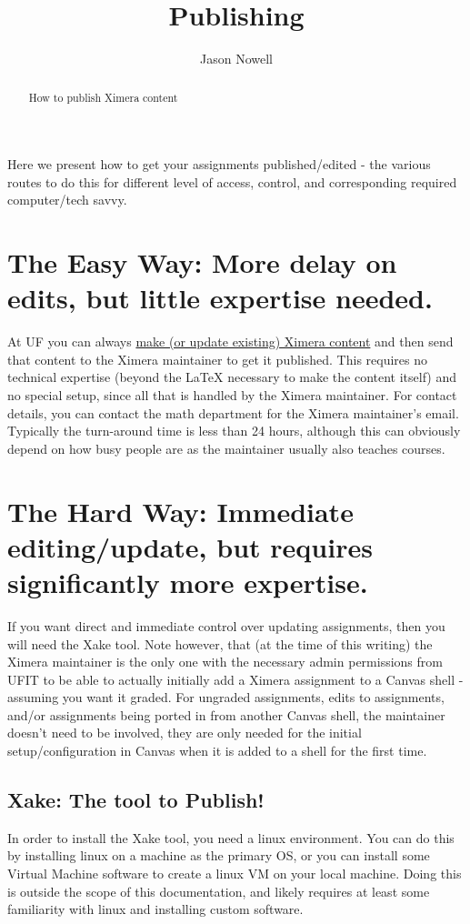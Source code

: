 \documentclass{ximera}
\title{Publishing}
\author{Jason Nowell}
\begin{document}
\begin{abstract}
    How to publish Ximera content
\end{abstract}
\maketitle

Here we present how to get your assignments published/edited - the various routes to do this for different level of access, control, and corresponding required computer/tech savvy.

\section{The Easy Way: More delay on edits, but little expertise needed.}

    At UF you can always \href{https://xronos.clas.ufl.edu/examples/exampleCore/template/overleafTemplate}{make (or update existing) Ximera content} and then send that content to the Ximera maintainer to get it published. This requires no technical expertise (beyond the LaTeX necessary to make the content itself) and no special setup, since all that is handled by the Ximera maintainer. For contact details, you can contact the math department for the Ximera maintainer's email. Typically the turn-around time is less than 24 hours, although this can obviously depend on how busy people are as the maintainer usually also teaches courses.


\section{The Hard Way: Immediate editing/update, but requires significantly more expertise.}

    If you want direct and immediate control over updating assignments, then you will need the Xake tool. Note however, that (at the time of this writing) the Ximera maintainer is the only one with the necessary admin permissions from UFIT to be able to actually initially add a Ximera assignment to a Canvas shell - assuming you want it graded. For ungraded assignments, edits to assignments, and/or assignments being ported in from another Canvas shell, the maintainer doesn't need to be involved, they are only needed for the initial setup/configuration in Canvas when it is added to a shell for the first time.

    \subsection{Xake: The tool to Publish!}
        In order to install the Xake tool, you need a linux environment. You can do this by installing linux on a machine as the primary OS, or you can install some Virtual Machine software to create a linux VM on your local machine. Doing this is outside the scope of this documentation, and likely requires at least some familiarity with linux and installing custom software.
        
\end{document}
